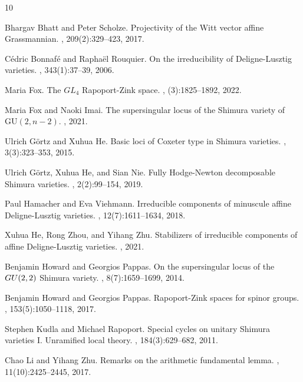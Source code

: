 \documentclass[11pt]{alggeom}
\begin{document}
\begin{thebibliography}{10}

Bhargav Bhatt and Peter Scholze.
\newblock Projectivity of the {W}itt vector affine {G}rassmannian.
, 209(2):329--423, 2017.

C\'{e}dric Bonnaf\'{e} and Rapha\"{e}l Rouquier.
\newblock On the irreducibility of {D}eligne-{L}usztig varieties.
, 343(1):37--39, 2006.

Maria Fox.
\newblock The {$GL_4$} {R}apoport-{Z}ink space.
, (3):1825--1892, 2022.

Maria Fox and Naoki Imai.
\newblock The supersingular locus of the {S}himura variety of
  $\mathrm{GU}(2,n-2)$.
, 2021.

Ulrich G\"{o}rtz and Xuhua He.
\newblock Basic loci of {C}oxeter type in {S}himura varieties.
, 3(3):323--353, 2015.

Ulrich G\"{o}rtz, Xuhua He, and Sian Nie.
\newblock Fully {H}odge-{N}ewton decomposable {S}himura varieties.
, 2(2):99--154, 2019.

Paul Hamacher and Eva Viehmann.
\newblock Irreducible components of minuscule affine {D}eligne-{L}usztig
  varieties.
, 12(7):1611--1634, 2018.

Xuhua He, Rong Zhou, and Yihang Zhu.
\newblock Stabilizers of irreducible components of affine {D}eligne-{L}usztig
  varieties.
, 2021.

Benjamin Howard and Georgios Pappas.
\newblock On the supersingular locus of the {${\rm GU}(2,2)$} {S}himura
  variety.
, 8(7):1659--1699, 2014.

Benjamin Howard and Georgios Pappas.
\newblock Rapoport-{Z}ink spaces for spinor groups.
, 153(5):1050--1118, 2017.

Stephen Kudla and Michael Rapoport.
\newblock Special cycles on unitary {S}himura varieties {I}. {U}nramified local
  theory.
, 184(3):629--682, 2011.

Chao Li and Yihang Zhu.
\newblock Remarks on the arithmetic fundamental lemma.
, 11(10):2425--2445, 2017.


\end{thebibliography}
\end{document}
